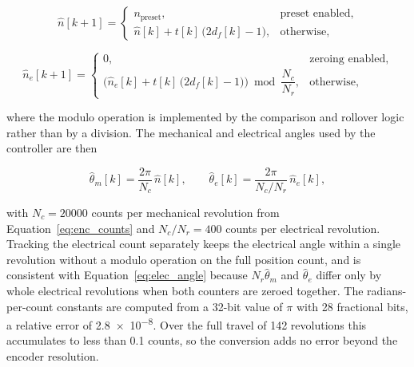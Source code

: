 \begin{equation}
	\hat{n}[k+1] =
	\begin{cases}
		n_{\mathrm{preset}}, & \text{preset enabled}, \\
		\hat{n}[k] + t[k]\,\big(2 d_f[k] - 1\big), & \text{otherwise},
	\end{cases}
	\label{eq:enc_decode_count}
\end{equation}

\begin{equation}
	\hat{n}_e[k+1] =
	\begin{cases}
		0, & \text{zeroing enabled}, \\
		\Big( \hat{n}_e[k] + t[k]\,\big(2 d_f[k] - 1\big) \Big) \bmod \dfrac{N_c}{N_r}, & \text{otherwise},
	\end{cases}
	\label{eq:enc_decode_elec}
\end{equation}

where the modulo operation is implemented by the comparison and rollover logic rather than by a division. The mechanical and electrical angles used by the controller are then

\begin{equation}
	\hat{\theta}_m[k] = \frac{2\pi}{N_c}\, \hat{n}[k],
	\qquad
	\hat{\theta}_e[k] = \frac{2\pi}{N_c / N_r}\, \hat{n}_e[k],
	\label{eq:enc_angles}
\end{equation}


with $N_c = 20000$ counts per mechanical revolution from Equation~\eqref{eq:enc_counts} and $N_c / N_r = 400$ counts per electrical revolution. Tracking the electrical count separately keeps the electrical angle within a single revolution without a modulo operation on the full position count, and is consistent with Equation~\eqref{eq:elec_angle} because $N_r \hat{\theta}_m$ and $\hat{\theta}_e$ differ only by whole electrical revolutions when both counters are zeroed together. The radians-per-count constants are computed from a 32-bit value of $\pi$ with 28 fractional bits, a relative error of \num{2.8e-8}. Over the full travel of 142 revolutions this accumulates to less than 0.1 counts, so the conversion adds no error beyond the encoder resolution.

